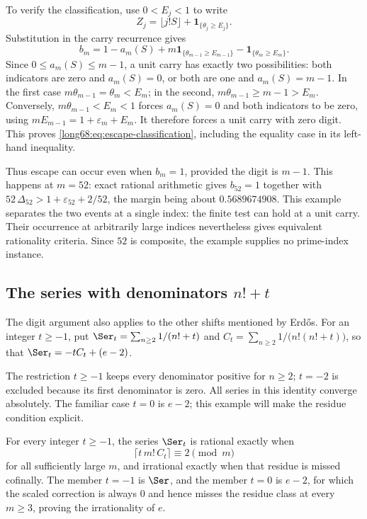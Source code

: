 To verify the classification, use $0<E_j<1$ to write
\[
 Z_j=\lfloor j!S\rfloor+\mathbf1_{\{\theta_j\ge E_j\}}.
\]
Substitution in the carry recurrence gives
\[
 b_m=1-a_m(S)+m\mathbf1_{\{\theta_{m-1}\ge E_{m-1}\}}
                 -\mathbf1_{\{\theta_m\ge E_m\}}.
\]
Since $0\le a_m(S)\le m-1$, a unit carry has exactly two possibilities:
both indicators are zero and $a_m(S)=0$, or both are one and
$a_m(S)=m-1$. In the first case $m\theta_{m-1}=\theta_m<E_m$;
in the second, $m\theta_{m-1}\ge m-1>E_m$.
Conversely, $m\theta_{m-1}<E_m<1$ forces $a_m(S)=0$ and both
indicators to be zero, using
$mE_{m-1}=1+\varepsilon_m+E_m$. It therefore forces a unit carry with
zero digit. This proves \eqref{long68:eq:escape-classification}, including
the equality case in its left-hand inequality.

Thus escape can occur even when $b_m=1$, provided the digit is $m-1$.
This happens at $m=52$: exact
rational arithmetic gives $b_{52}=1$ together with
$52\,\Delta_{52}>1+\varepsilon_{52}+2/52$, the margin being about
$0.5689674908$.  This example separates the two events at a single index: the finite test
can hold at a unit carry. Their occurrence at arbitrarily large indices
nevertheless gives equivalent rationality criteria. Since $52$ is
composite, the example supplies no prime-index instance.

\subsection{The series with denominators \texorpdfstring{$n!+t$}{n!+t}}

The digit argument also applies to the other shifts mentioned by
Erd\H{o}s. For an integer $t\ge-1$, put
$\Ser_t=\sum_{n\ge2}1/(n!+t)$ and $C_t=\sum_{n\ge2}1/\bigl(n!(n!+t)\bigr)$,
so that $\Ser_t=-tC_t+(e-2)$.

The restriction $t\ge-1$ keeps every denominator positive for $n\ge2$;
$t=-2$ is excluded because its first denominator is zero. All series in
this identity converge absolutely. The familiar case $t=0$ is $e-2$;
this example will make the residue condition explicit.

\begin{theorem}\label{long68:res:shift-family}
For every integer $t\ge-1$, the series $\Ser_t$ is rational exactly when
\[
 \bigl\lceil t\,m!\,C_t\bigr\rceil\equiv2\pmod m
\]
for all sufficiently large $m$, and irrational exactly when that residue is
missed cofinally.  The member $t=-1$ is $\Ser$, and the member $t=0$ is
$e-2$, for which the scaled correction is always $0$ and hence misses the residue class
at every $m\ge3$, proving the irrationality of $e$.
\end{theorem}

